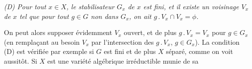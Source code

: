 \textit{\textup{(D)} Pour tout $x\in X$, le stabilisateur $G_x$ de $x$ est
fini, et il existe un voisinage $V_x$ de $x$ tel que pour tout $g\in G$ non
dans $G_x$, on ait $g\mathbin{.}V_x\cap V_x=\phi$.}

On peut alors supposer évidemment $V_x$ ouvert, et de plus
$g\mathbin{.}V_x=V_x$ pour $g\in G_x$ (en remplaçant au besoin $V_x$ par
l'intersection des $g\mathbin{.}V_x$, $g\in G_x$). La condition (D) est vérifiée
par exemple si $G$ est fini et de plus $X$ séparé, comme on voit aussitôt. Si
$X$ est une variété algébrique irréductible munie de sa

\endgroup
{}
